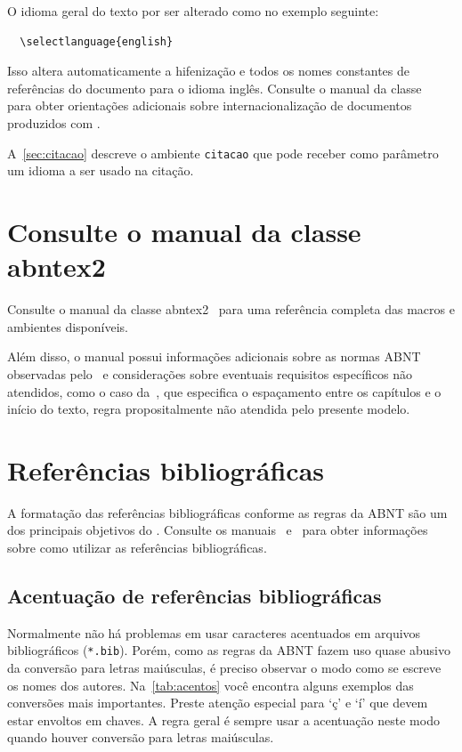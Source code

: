 O idioma geral do texto por ser alterado como no exemplo seguinte:

\begin{verbatim}
  \selectlanguage{english}
\end{verbatim}

Isso altera automaticamente a hifenização e todos os nomes constantes de
referências do documento para o idioma inglês. Consulte o manual da classe~\cite{abntex2classe} para obter orientações adicionais sobre internacionalização de
documentos produzidos com \abnTeX.

A~\autoref{sec:citacao} descreve o ambiente \texttt{citacao} que pode receber
como parâmetro um idioma a ser usado na citação.

\section{Consulte o manual da classe \textsf{abntex2}}

Consulte o manual da classe \textsf{abntex2}~\cite{abntex2classe} para uma
referência completa das macros e ambientes disponíveis.

Além disso, o manual possui informações adicionais sobre as normas ABNT
observadas pelo \abnTeX\ e considerações sobre eventuais requisitos específicos
não atendidos, como o caso da~, que
especifica o espaçamento entre os capítulos e o início do texto, regra
propositalmente não atendida pelo presente modelo.

\section{Referências bibliográficas}

A formatação das referências bibliográficas conforme as regras da ABNT são um
dos principais objetivos do \abnTeX. Consulte os manuais~ e~ para obter informações
sobre como utilizar as referências bibliográficas.

\subsection{Acentuação de referências bibliográficas}

Normalmente não há problemas em usar caracteres acentuados em arquivos
bibliográficos (\texttt{*.bib}). Porém, como as regras da ABNT fazem uso quase
abusivo da conversão para letras maiúsculas, é preciso observar o modo como se
escreve os nomes dos autores. Na~\autoref{tab:acentos} você encontra alguns
exemplos das conversões mais importantes. Preste atenção especial para `ç' e `í'
que devem estar envoltos em chaves. A regra geral é sempre usar a acentuação
neste modo quando houver conversão para letras maiúsculas.

